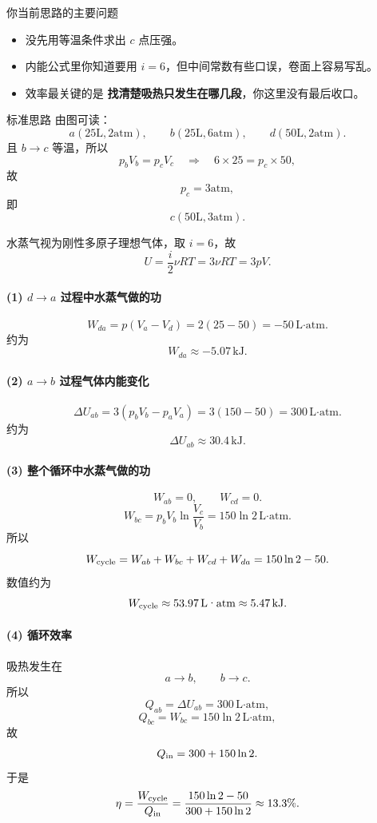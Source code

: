 \documentclass[11pt,a4paper]{ctexart}
\newcommand{\key}[1]{\textcolor{theme}{\textbf{#1}}}
\begin{document}
\begin{warnbox}{你当前思路的主要问题}
\begin{itemize}
  \item 没先用等温条件求出 \(c\) 点压强。
  \item 内能公式里你知道要用 \(i=6\)，但中间常数有些口误，卷面上容易写乱。
  \item 效率最关键的是 \key{找清楚吸热只发生在哪几段}，你这里没有最后收口。
\end{itemize}
\end{warnbox}

\begin{stepbox}{标准思路}
由图可读：
\[
a(25\text{L},2\text{atm}),\qquad
b(25\text{L},6\text{atm}),\qquad
d(50\text{L},2\text{atm}).
\]
且 \(b\to c\) 等温，所以
\[
p_bV_b=p_cV_c
\quad\Rightarrow\quad
6\times 25 = p_c\times 50,
\]
故
\[
p_c=3\text{atm},
\]
即
\[
c(50\text{L},3\text{atm}).
\]

水蒸气视为刚性多原子理想气体，取 \(i=6\)，故
\[
U=\frac{i}{2}\nu RT = 3\nu RT = 3pV.
\]

\paragraph{(1) \(d\to a\) 过程中水蒸气做的功}
\[
W_{da}=p(V_a-V_d)=2(25-50)=-50\,\text{L·atm}.
\]
约为
\[
W_{da}\approx -5.07\,\text{kJ}.
\]

\paragraph{(2) \(a\to b\) 过程气体内能变化}
\[
\Delta U_{ab}=3(p_bV_b-p_aV_a)=3(150-50)=300\,\text{L·atm}.
\]
约为
\[
\Delta U_{ab}\approx 30.4\,\text{kJ}.
\]

\paragraph{(3) 整个循环中水蒸气做的功}
\[
W_{ab}=0,\qquad W_{cd}=0.
\]
\[
W_{bc}=p_bV_b\ln\frac{V_c}{V_b}=150\ln 2\,\text{L·atm}.
\]
所以
\[
W_{\rm cycle}=W_{ab}+W_{bc}+W_{cd}+W_{da}
=150\ln2-50.
\]
数值约为
\[
W_{\rm cycle}\approx 53.97\,\text{L·atm}\approx 5.47\,\text{kJ}.
\]

\paragraph{(4) 循环效率}
吸热发生在
\[
a\to b,\qquad b\to c.
\]
所以
\[
Q_{ab}=\Delta U_{ab}=300\,\text{L·atm},
\]
\[
Q_{bc}=W_{bc}=150\ln2\,\text{L·atm},
\]
故
\[
Q_{\rm in}=300+150\ln2.
\]
于是
\[
\eta=\frac{W_{\rm cycle}}{Q_{\rm in}}
=\frac{150\ln2-50}{300+150\ln2}
\approx 13.3\%.
\]
\end{stepbox}
\end{document}
